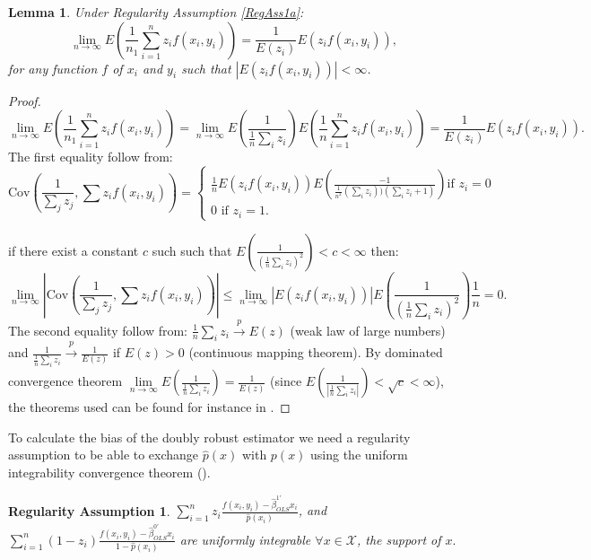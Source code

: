 \documentclass[11pt]{article}
\newtheorem{Lem}{Lemma}
\newtheorem{RegAss}{Regularity Assumption}
\newcommand{\Cov}{{\mbox{Cov}}}
\newcommand{\limes}{\lim \limits_{n\to\infty}}
\begin{document}
\begin{Lem}
\label{Lem2}
Under Regularity Assumption \ref{RegAss1a}:
$$\limes E\left(\frac{1}{n_1}\sum_{i=1}^{n}z_i f(x_i,y_i)\right) = \frac{1}{E(z_i)}E\left(z_i f(x_i,y_i)\right),$$ 
for any function $f$ of $x_i$ and $y_i$ such that $\left| E\left(z_i f(x_i,y_i)\right)\right|<\infty$.
\end{Lem}
	\begin{proof}
 $$\limes E\left(\frac{1}{n_1}\sum \limits_{i =1}^nz_i f(x_i,y_i)\right)=\limes  E\left(\frac{1}{\frac{1}{n}\sum_i z_i}\right) E\left(\frac{1}{n}\sum \limits_{i =1}^nz_i f(x_i,y_i)\right)=\frac{1}{E(z_i)}E\left(z_i f(x_i,y_i)\right).$$
The first equality follow from:
$$
\Cov\left(\frac{1}{\sum_j z_j}, \sum z_i f(x_i,y_i)\right)= \begin{cases}\frac{1}{n} E\left(z_i f(x_i,y_i)\right) E\left(\frac{-1}{\frac{1}{n^2}(\sum_i z_i))(\sum_i z_i+1)}\right) \mbox{if }z_i=0\\
0\mbox{ if } z_i=1.\end{cases}
$$

if there exist a constant $c$ such such that $E\left(\frac{1}{( \frac{1}{n}\sum_i z_i)^2}\right)<c<\infty$ then:
$$
\limes \left| \Cov\left(\frac{1}{\sum_j z_j}, \sum z_i f(x_i,y_i)\right) \right| \leq \limes\left| E\left(z_i f(x_i,y_i)\right)\right| E\left(\frac{1}{(\frac{1}{n}\sum_iz_i)^2} \right)\frac{1}{n}=0.
$$
The second equality follow from: $\frac{1}{n}\sum_i z_i\xrightarrow{p}E(z)$ (weak law of large numbers) and  $\frac{1}{\frac{1}{n}\sum_i z_i}\xrightarrow{p}\frac{1}{E(z)}$ if $E(z)>0$ (continuous mapping theorem). By dominated convergence theorem $\limes E\left(\frac{1}{\frac{1}{n}\sum_i z_i}\right)=\frac{1}{E(z)}$ (since $E\left(\frac{1}{| \frac{1}{n}\sum_i z_i|}\right)<\sqrt{c}<\infty$), the theorems used can be found for instance in \cite{Rosenthal}. 
	\end{proof}

To calculate the bias of the doubly robust estimator we need a regularity assumption to be able to exchange $\hat p(x)$ with $p(x)$ using the uniform integrability convergence theorem (\citealp{Rosenthal}).

\begin{RegAss}
\label{RegAss2} 
$\sum \limits_{i =1}^n z_i \frac{f(x_i,y_i)-\hat\beta^{1'}_{OLS}x_i}{\hat{p}(x_i)}$, and $\sum \limits_{i =1}^n (1-z_i)\frac{f(x_i,y_i)-\hat\beta^{0'}_{OLS}x_i}{1-\hat{p}(x_i)}$ are uniformly integrable $\forall x \in \mathcal{X}$, the support of $x.$
\end{RegAss}
\end{document}
